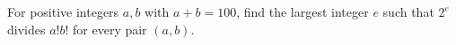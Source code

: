For positive integers $a,b$ with $a+b=100$, find the largest integer $e$ such that $2^e$ divides $a!b!$ for every pair $(a,b)$.
